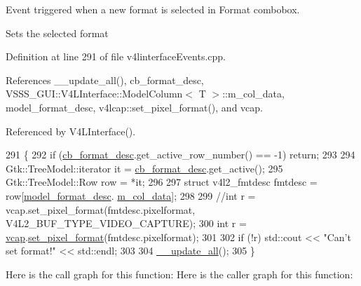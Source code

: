 Event triggered when a new format is selected in Format combobox. 

Sets the selected format 

Definition at line 291 of file v4linterface\+Events.\+cpp.



References \+\_\+\+\_\+update\+\_\+all(), cb\+\_\+format\+\_\+desc, V\+S\+S\+S\+\_\+\+G\+U\+I\+::\+V4\+L\+Interface\+::\+Model\+Column$<$ T $>$\+::m\+\_\+col\+\_\+data, model\+\_\+format\+\_\+desc, v4lcap\+::set\+\_\+pixel\+\_\+format(), and vcap.



Referenced by V4\+L\+Interface().


\begin{DoxyCode}
291                                                       \{
292         \textcolor{keywordflow}{if} (\hyperlink{class_v_s_s_s___g_u_i_1_1_v4_l_interface_a1f6b2f08ccbc0ecbfba96311ac07aa44}{cb\_format\_desc}.get\_active\_row\_number() == -1) \textcolor{keywordflow}{return};
293 
294         Gtk::TreeModel::iterator it = \hyperlink{class_v_s_s_s___g_u_i_1_1_v4_l_interface_a1f6b2f08ccbc0ecbfba96311ac07aa44}{cb\_format\_desc}.get\_active();
295         Gtk::TreeModel::Row row = *it;
296 
297         \textcolor{keyword}{struct }v4l2\_fmtdesc fmtdesc = row[\hyperlink{class_v_s_s_s___g_u_i_1_1_v4_l_interface_abd94aec4d6c691967cee26950e179fd1}{model\_format\_desc}.
      \hyperlink{class_v_s_s_s___g_u_i_1_1_v4_l_interface_1_1_model_column_aa6720e1b3e47adb85d36c3ec3a2bb262}{m\_col\_data}];
298 
299         \textcolor{comment}{//int r = vcap.set\_pixel\_format(fmtdesc.pixelformat, V4L2\_BUF\_TYPE\_VIDEO\_CAPTURE);}
300         \textcolor{keywordtype}{int} r = \hyperlink{class_v_s_s_s___g_u_i_1_1_v4_l_interface_a7ece61f4ccc6d5321c445e60f34e7f33}{vcap}.\hyperlink{classv4lcap_a7da8705c4a542bb1118f74435957c471}{set\_pixel\_format}(fmtdesc.pixelformat);
301 
302         \textcolor{keywordflow}{if} (!r) std::cout << \textcolor{stringliteral}{"Can't set format!"} << std::endl;
303 
304         \hyperlink{class_v_s_s_s___g_u_i_1_1_v4_l_interface_ac3fe0a20fd30c6e9505eb375ef63e52e}{\_\_update\_all}();
305     \}
\end{DoxyCode}
Here is the call graph for this function\+:
Here is the caller graph for this function\+:
\mbox{\label{class_v_s_s_s___g_u_i_1_1_v4_l_interface_ad78e73dabab1c7caa41a45c363eef205}} 
